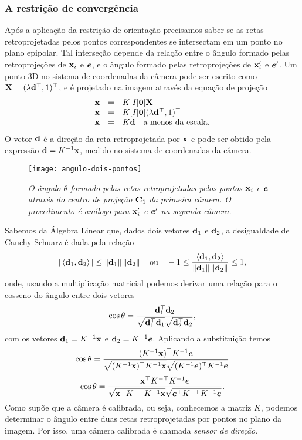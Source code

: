 \subsubsection{A restrição de convergência}
Após a aplicação da restrição de orientação precisamos saber se as retas retroprojetadas pelos pontos correspondentes se intersectam em um ponto no plano epipolar. Tal interseção depende da relação entre o ângulo formado pelas retroprojeções de $\mathbf{x}_i$ e $\boldsymbol{e}$, e o ângulo formado pelas retroprojeções de $\mathbf{x}'_i$ e $\boldsymbol{e}'$. Um ponto 3D no sistema de coordenadas da câmera pode ser escrito como $\mathbf{X}=(\lambda {\bf d}^\top,1)^\top$, e é projetado na imagem através da equação de projeção
\begin{equation*}
\begin{array}{rcl}
\mathbf{x}&=&K[I|{\bf 0}]\mathbf{X}\\
\mathbf{x}&=&K[I|{\bf 0}](\lambda {\bf d}^\top,1)^\top\\
\mathbf{x}&=&K{\bf d}\quad\text{a menos da escala.}
\end{array}
\end{equation*}
O vetor ${\bf d}$ é a direção da reta retroprojetada por $\mathbf{x}$ e pode ser obtido pela expressão ${\bf d}=K^{-1}\mathbf{x}$, medido no sistema de coordenadas da câmera.
\begin{figure}[!htb]
\centering
\texttt{[image: angulo-dois-pontos]}
\caption{{\it O ângulo $\theta$ formado pelas retas retroprojetadas pelos pontos $\mathbf{x}_i$ e $\boldsymbol{e}$ através do centro de projeção ${\bf C}_1$ da primeira câmera. O procedimento é análogo para $\mathbf{x}'_i$ e $\boldsymbol{e}'$ na segunda câmera.}}
\end{figure}
Sabemos da Álgebra Linear que, dados dois vetores ${\bf d}_1$ e ${\bf d}_2$, a desigualdade de Cauchy-Schuarz é dada pela relação 
\begin{equation*}
|\left\langle{\bf d}_1,{\bf d}_2\right\rangle|\leq\left\|{\bf d}_1\right\|\left\|{\bf d}_2\right\|\quad\text{ou}\quad -1\leq\frac{\left\langle{\bf d}_1,{\bf d}_2\right\rangle}{\left\|{\bf d}_1\right\|\left\|{\bf d}_2\right\|}\leq 1,
\end{equation*}
onde, usando a multiplicação matricial podemos derivar uma relação para o cosseno do ângulo entre dois vetores
\begin{equation*}
\cos\theta=\frac{{\bf d}_1^\top{\bf d}_2}{\sqrt{{\bf d}_1^\top{\bf d}_1}\sqrt{{\bf d}_2^\top{\bf d}_2}},
\end{equation*}
com os vetores ${\bf d}_1=K^{-1}\mathbf{x}$ e ${\bf d}_2=K^{-1}\boldsymbol{e}$. Aplicando a substituição temos
\begin{equation*}
\cos\theta=\frac{(K^{-1}\mathbf{x})^\top K^{-1}\boldsymbol{e}}{\sqrt{(K^{-1}\mathbf{x})^\top K^{-1}\mathbf{x}}\sqrt{(K^{-1}\boldsymbol{e})^\top K^{-1}\boldsymbol{e}}}
\end{equation*}
\begin{equation}\label{eq.cos-theta}
\cos\theta=\frac{\mathbf{x}^\top K^{-\top} K^{-1}\boldsymbol{e}}{\sqrt{\mathbf{x}^\top K^{-\top} K^{-1}\mathbf{x}}\sqrt{\boldsymbol{e}^\top K^{-\top} K^{-1}\boldsymbol{e}}}.
\end{equation}
Como \citep{2503343} supõe que a câmera é calibrada, ou seja, conhecemos a matriz $K$, podemos determinar o ângulo entre duas retas retroprojetadas por pontos no plano da imagem. Por isso, uma câmera calibrada é chamada {\it sensor de direção}.

